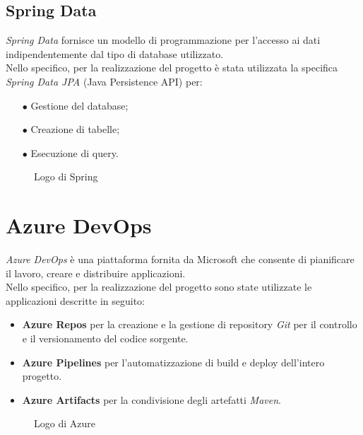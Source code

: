 \subsection{Spring Data}\label{sec:springdata}
\emph{Spring Data} fornisce un modello di programmazione per l'accesso ai dati indipendentemente dal tipo di database utilizzato. \cite{SpringData}\\
Nello specifico, per la realizzazione del progetto è stata utilizzata la specifica \emph{Spring Data JPA} \cite{SpringDataJPA} (Java Persistence API) per:
\begin{itemize}
	\item[$\bullet$]Gestione del database;
	\item[$\bullet$]Creazione di tabelle;
	\item[$\bullet$]Esecuzione di query.
\end{itemize}

\begin{figure}[ht]
	\centering
	\caption{Logo di Spring}
	\label{fig:one}
\end{figure}


\section{Azure DevOps}\label{sec:azure}
\emph{Azure DevOps} è una piattaforma fornita da Microsoft che consente di pianificare il lavoro, creare e distribuire applicazioni. \cite{Microsoft}\\
Nello specifico, per la realizzazione del progetto sono state utilizzate le applicazioni descritte in seguito:
\begin{itemize}
	\item \textbf{Azure Repos} per la creazione e la gestione di repository \emph{Git} per il controllo e il versionamento del codice sorgente.
	\item \textbf{Azure Pipelines} per l'automatizzazione di build e deploy dell'intero progetto.
	\item \textbf{Azure Artifacts} per la condivisione degli artefatti \emph{Maven}.
\end{itemize}
\begin{figure}[ht]
	\centering
	\caption{Logo di Azure}
	\label{fig:one}
\end{figure}

